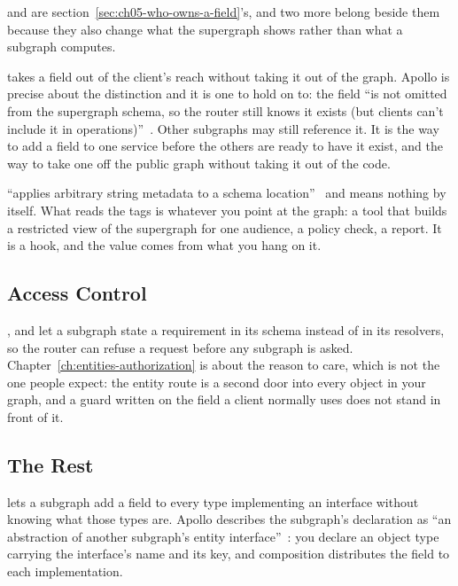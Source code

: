 %
 and  are
section~\ref{sec:ch05-who-owns-a-field}'s, and two more belong beside them
because they also change what the supergraph shows rather than what a subgraph
computes.

%
 takes a field out of the client's reach without taking it
out of the graph. Apollo is precise about the distinction and it is one to
hold on to: the field \enquote{is not omitted from the supergraph schema, so
the router still knows it exists (but clients can't include it in
operations)}~\autocite{apollodirectives}. Other subgraphs may still reference
it. It is the way to add a field to one service before the others are ready to
have it exist, and the way to take one off the public graph without taking it
out of the code.

%
 \enquote{applies arbitrary string metadata to a schema
location}~\autocite{apollodirectives} and means nothing by itself. What reads
the tags is whatever you point at the graph: a tool that builds a restricted
view of the supergraph for one audience, a policy check, a report. It is a
hook, and the value comes from what you hang on it.

\subsection{Access Control}

%
,  and  let a subgraph
state a requirement in its schema instead of in its resolvers, so the router
can refuse a request before any subgraph is asked. Chapter~\ref{ch:entities-authorization}
is about the reason to care, which is not the one people expect: the entity
route is a second door into every object in your graph, and a guard written on
the field a client normally uses does not stand in front of it.

\subsection{The Rest}

%
 lets a subgraph add a field to every type implementing
an interface without knowing what those types are. Apollo describes the
subgraph's declaration as \enquote{an abstraction of another subgraph's entity
interface}~\autocite{apollodirectives}: you declare an object type carrying the
interface's name and its key, and composition distributes the field to each
implementation.

